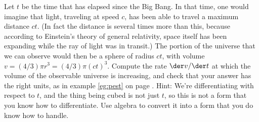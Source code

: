 Let $t$ be the time that has elapsed since the Big Bang. In that time, one would imagine that light, traveling at speed
$c$, has been able to travel a maximum distance $ct$. (In fact the distance is several times more than this, because
according to Einstein's theory of general relativity, space itself has been expanding while the ray of light was
in transit.) The portion of the universe that we can observe
would then be a sphere of radius $ct$, with volume $v=(4/3)\pi r^3=(4/3)\pi(ct)^3$. Compute the rate
$\der v/\der t$ at which the volume of the observable universe is increasing, and check that your answer has the right units,
as in example \ref{eg:pest} on page \pageref{eg:pest}.
Hint: We're differentiating with respect to $t$, and the thing being cubed is not
just $t$, so this is not a form that you know how to differentiate. Use algebra
to convert it into a form that you do know how to handle.\answercheck
